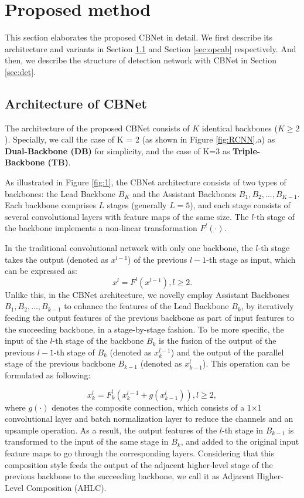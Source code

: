 \documentclass[letterpaper]{article} \usepackage{aaai20}  \usepackage{multirow}
\begin{document}
\section{Proposed method}
\label{section 3}
This section elaborates the proposed CBNet in detail. We first describe its architecture and variants in Section \ref{sec:arc} and Section \ref{sec:opcab} respectively. And then, we describe the structure of detection network with CBNet in Section \ref{sec:det}.


\subsection{Architecture of CBNet}
\label{sec:arc}

The architecture of the proposed CBNet consists of $K$ identical backbones ($K\ge2$). Specially, we call the case of K = 2 (as shown in Figure \ref{fig:RCNN}.a) as \textbf{Dual-Backbone (DB)} for simplicity, and the case of K=3 as \textbf{Triple- Backbone (TB)}.

As illustrated in Figure \ref{fig:1}, the CBNet architecture consists of two types of backbones: the Lead Backbone $B_{K}$ and the Assistant Backbones $B_{1}, B_{2}, ... , B_{K-1}$. Each backbone comprises $L$ stages (generally $L=5$), and each stage consists of several convolutional layers with feature maps of the same size. The $l$-th stage of the backbone implements a non-linear transformation $F^l(\cdot)$.

In the traditional convolutional network with only one backbone, the $l$-th stage takes the output (denoted as $x^{l-1}$) of the previous $l-1$-th stage as input, which can be expressed as:
\begin{equation}
\label{equa1}
x^l = F^l(x^{l-1}),  l\ge2.
\end{equation}
Unlike this, in the CBNet architecture, we novelly employ Assistant Backbones $B_{1}, B_{2}, ... , B_{k-1}$ to enhance the features of the Lead Backbone $B_k$, by iteratively feeding the output features of the previous backbone as part of input features to the succeeding backbone, in a stage-by-stage fashion. To be more specific, the input of the $l$-th stage of the backbone $B_k$ is the fusion of the output of the previous $l-1$-th stage of $B_k$ (denoted as $x_k^{l-1}$) and the output of the parallel stage of the previous backbone $B_{k-1}$ (denoted as $x_{k-1}^l$). This operation can be formulated as following:

\begin{equation}
\label{equa2}
x_k^l = F_k^l(x_k^{l-1} + g(x_{k-1}^l)),  l\ge2,
\end{equation}
where $g(\cdot)$ denotes the composite connection, which consists of a 1$\times$1 convolutional layer and batch normalization layer to reduce the channels and an upsample operation. As a result, the output features of the $l$-th stage in $B_{k-1}$ is transformed to the input of the same stage in $B_k$, and added to the original input feature maps to go through the corresponding layers. Considering that this composition style feeds the output of the adjacent higher-level stage of the previous backbone to the succeeding backbone, we call it as Adjacent Higher-Level Composition (AHLC).
\end{document}
